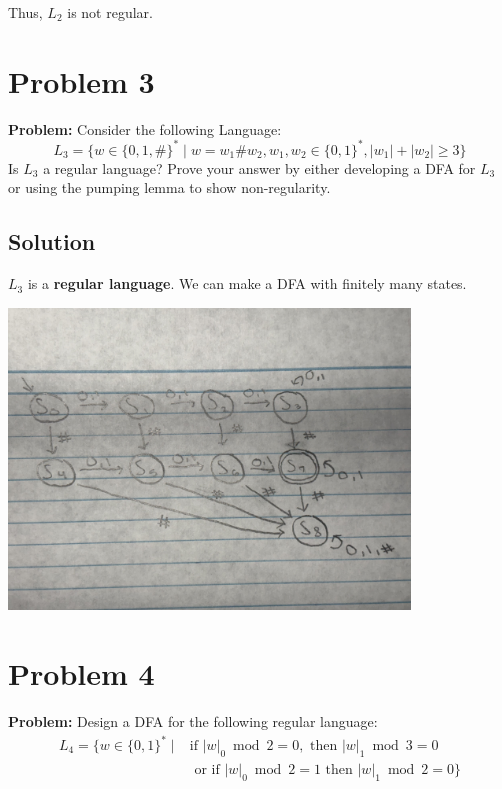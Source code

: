 \documentclass[12pt]{article}
\begin{document}
Thus, $L_2$ is not regular.

\newpage

\section*{Problem 3}

\textbf{Problem:} Consider the following Language:
$$L_3 = \{w \in \{0, 1, \#\}^* \mid w = w_1\#w_2, w_1, w_2 \in \{0, 1\}^*, |w_1| + |w_2| \geq 3\}$$
Is $L_3$ a regular language? Prove your answer by either developing a DFA for $L_3$ or using the pumping lemma to show non-regularity.

\subsection*{Solution}

$L_3$ is a \textbf{regular language}. We can make a DFA with finitely many states.

\begin{center}
\includegraphics[width=0.8\textwidth]{problem3_diagram.png}
\end{center}




\newpage





\section*{Problem 4}

\textbf{Problem:} Design a DFA for the following regular language:
\begin{align*}
L_4 = \{w \in \{0, 1\}^* \mid &\text{if } |w|_0 \bmod 2 = 0, \text{ then } |w|_1 \bmod 3 = 0\\
&\text{ or if } |w|_0 \bmod 2 = 1 \text{ then } |w|_1 \bmod 2 = 0\}
\end{align*}
\end{document}
